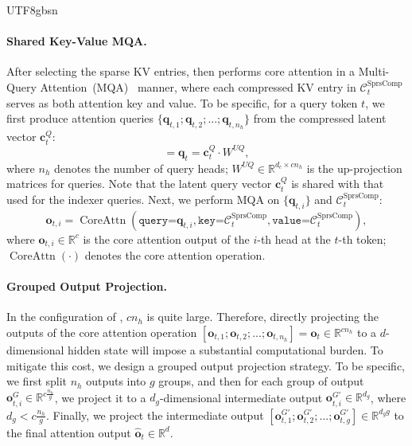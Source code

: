 \begin{CJK*}{UTF8}{gbsn}
\paragraph{Shared Key-Value MQA.}
After selecting the sparse KV entries, \csa{} then performs core attention in a Multi-Query Attention~(MQA)~\citep{mqa} manner, where each compressed KV entry in $\mathcal{C}^{\text{SprsComp}}_t$ serves as both attention key and value. 
To be specific, for a query token $t$, we first produce attention queries $\{\mathbf{q}_{t, 1};\mathbf{q}_{t, 2};...;\mathbf{q}_{t, n_{h}}\}$ from the compressed latent vector $\mathbf{c}_{t}^{Q}$:
\begin{equation}
    [\mathbf{q}_{t, 1};\mathbf{q}_{t, 2};...;\mathbf{q}_{t, n_{h}}] = \mathbf{q}_{t} = \mathbf{c}_{t}^{Q} \cdot W^{UQ},
\end{equation}
where $n_{h}$ denotes the number of query heads; $W^{UQ} \in \mathbb{R}^{d_c \times c n_h}$ is the up-projection matrices for queries.
Note that the latent query vector $\mathbf{c}_{t}^{Q}$ is shared with that used for the indexer queries. 
Next, we perform MQA on $\{\mathbf{q}_{t, i}\}$ and $\mathcal{C}^{\text{SprsComp}}_t$: 
\begin{equation}
    \mathbf{o}_{t,i} = \operatorname{CoreAttn}\left( \texttt{query=}\mathbf{q}_{t,i}, \texttt{key=}\mathcal{C}^{\text{SprsComp}}_t, \texttt{value=}\mathcal{C}^{\text{SprsComp}}_t \right),
\end{equation}
where $\mathbf{o}_{t,i} \in \mathbb{R}^{c}$ is the core attention output of the $i$-th head at the $t$-th token; $\operatorname{CoreAttn}(\cdot)$ denotes the core attention operation. 

\paragraph{Grouped Output Projection.}
In the configuration of \dsviv{}, $c n_h$ is quite large.
Therefore, directly projecting the outputs of the core attention operation $[\mathbf{o}_{t,1}; \mathbf{o}_{t,2}; ...; \mathbf{o}_{t,n_h}]=\mathbf{o}_{t} \in \mathbb{R}^{c n_h}$ to a $d$-dimensional hidden state will impose a substantial computational burden. 
To mitigate this cost, we design a grouped output projection strategy.
To be specific, we first split $n_h$ outputs into $g$ groups, and then for each group of output $\mathbf{o}^G_{t, i} \in \mathbb{R}^{c \frac{n_h}{g}}$, we project it to a $d_g$-dimensional intermediate output $\mathbf{o}^{G'}_{t, i} \in \mathbb{R}^{d_g}$, where $d_g < c \frac{n_h}{g}$. 
Finally, we project the intermediate output $[\mathbf{o}^{G'}_{t, 1}; \mathbf{o}^{G'}_{t, 2}; ...; \mathbf{o}^{G'}_{t, g}] \in \mathbb{R}^{d_gg}$ to the final attention output $\mathbf{\hat{o}}_{t} \in \mathbb{R}^{d}$. 


\end{CJK*}
